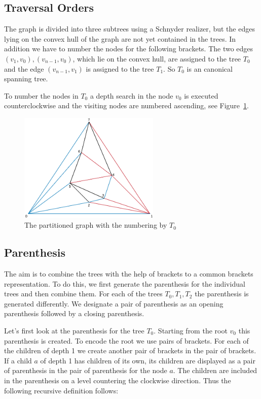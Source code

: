 \documentclass[a4paper]{scrartcl}
\begin{document}
\subsection{Traversal Orders}
The graph is divided into three subtrees using a Schnyder realizer, but the edges lying on the convex hull of the graph are not yet contained in the trees. In addition we have to number the nodes for the following brackets. 
The two edges $(v_1,v_0),(v_{n-1},v_0)$, which lie on the convex hull, are assigned to the tree $T_0$ and the edge $(v_{n-1},v_1)$ is assigned to the tree $T_1$. So $T_0$ is an canonical spanning tree.

To number the nodes in $T_0$ a depth search in the node $v_0$ is executed counterclockwise and the visiting nodes are numbered ascending, see Figure~\ref{fig:exampleTraversal}.

\begin{figure}[h]
	\centering
	\includegraphics[width=0.6\textwidth]{img/exampleTraversal}
	\caption{The partitioned graph with the numbering by $T_0$}
	\label{fig:exampleTraversal}
\end{figure}




\subsection{Parenthesis}
The aim is to combine the trees with the help of brackets to a common brackets representation. To do this, we first generate the parenthesis for the individual trees and then combine them. For each of the trees $T_0,T_1,T_2$ the parenthesis is generated differently. We designate a pair of parenthesis as an opening parenthesis followed by a closing parenthesis.

Let's first look at the parenthesis for the tree $T_0$. Starting from the root $v_0$ this parenthesis is created. To encode the root we use pairs of brackets. For each of the children of depth 1 we create another pair of brackets in the pair of brackets. If a child $a$ of depth 1 has children of its own, its children are displayed as a pair of parenthesis in the pair of parenthesis for the node $a$. The children are included in the parenthesis on a level countering the clockwise direction. Thus the following recursive definition follows:
\end{document}
